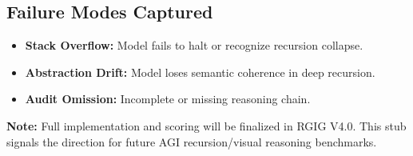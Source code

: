 \subsection*{Failure Modes Captured}
\begin{itemize}
  \item \textbf{Stack Overflow:} Model fails to halt or recognize recursion collapse.
  \item \textbf{Abstraction Drift:} Model loses semantic coherence in deep recursion.
  \item \textbf{Audit Omission:} Incomplete or missing reasoning chain.
\end{itemize}

\textbf{Note:} Full implementation and scoring will be finalized in RGIG V4.0. This stub signals the direction for future AGI recursion/visual reasoning benchmarks. 